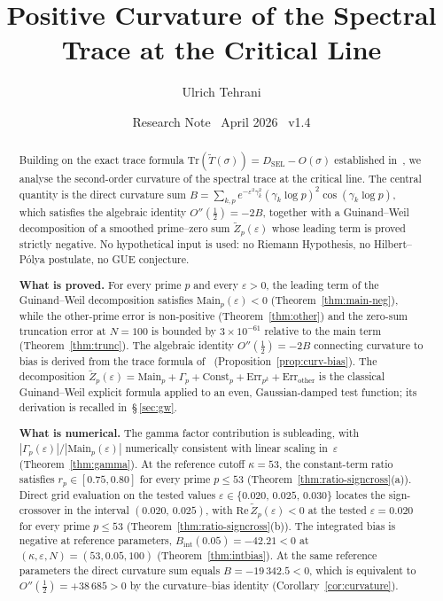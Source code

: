 \documentclass[11pt]{article}
\title{\vspace{-1.5em}\bfseries Positive Curvature of the Spectral Trace
at the Critical Line}
\author{Ulrich Tehrani}
\date{Research Note \textperiodcentered\ April 2026
      \textperiodcentered\ v1.4}
\newcommand{\Tt}{\widetilde{T}}
\newcommand{\Zt}{\widetilde{Z}}
\newcommand{\DSEL}{D_{\mathrm{SEL}}}
\begin{document}
\maketitle

\begin{abstract}
Building on the exact trace formula $\mathrm{Tr}(\Tt(\sigma))=\DSEL-O(\sigma)$
established in~\cite{Paper5}, we analyse the second-order curvature of the
spectral trace at the critical line.
The central quantity is the direct curvature sum
$B=\sum_{k,p} e^{-\varepsilon^2\gamma_k^2}(\gamma_k\log p)^2\cos(\gamma_k\log p)$,
which satisfies the algebraic identity $O''(\tfrac12)=-2B$, together with a
Guinand--Weil decomposition of a smoothed prime--zero sum $\Zt_p(\varepsilon)$
whose leading term is proved strictly negative.
No hypothetical input is used: no Riemann Hypothesis, no Hilbert--P\'olya
postulate, no GUE conjecture.

\textbf{What is proved.}
For every prime $p$ and every $\varepsilon>0$, the leading term of the
Guinand--Weil decomposition satisfies
$\mathrm{Main}_p(\varepsilon)<0$ (Theorem~\ref{thm:main-neg}), while the
other-prime error is non-positive
(Theorem~\ref{thm:other}) and the zero-sum truncation error at $N=100$
is bounded by $3\times 10^{-61}$ relative to the main term
(Theorem~\ref{thm:trunc}).
The algebraic identity $O''(\tfrac12)=-2B$ connecting curvature to bias
is derived from the trace formula of~\cite{Paper5}
(Proposition~\ref{prop:curv-bias}).
The decomposition
$\Zt_p(\varepsilon)=\mathrm{Main}_p+\Gamma_p+\mathrm{Const}_p
+\mathrm{Err}_{p^k}+\mathrm{Err}_{\mathrm{other}}$
is the classical Guinand--Weil explicit formula applied to an even,
Gaussian-damped test function; its derivation is recalled in~\S\,\ref{sec:gw}.

\textbf{What is numerical.}
The gamma factor contribution is subleading, with
$|\Gamma_p(\varepsilon)|/|\mathrm{Main}_p(\varepsilon)|$ numerically
consistent with linear scaling in~$\varepsilon$
(Theorem~\ref{thm:gamma}).
At the reference cutoff $\kappa=53$, the constant-term ratio satisfies
$r_p\in[0.75,0.80]$ for every prime $p\le 53$
(Theorem~\ref{thm:ratio-signcross}(a)).
Direct grid evaluation on the tested values
$\varepsilon\in\{0.020,\,0.025,\,0.030\}$ locates the sign-crossover
in the interval $(0.020,\,0.025)$, with
$\mathrm{Re}\,\Zt_p(\varepsilon)<0$ at the tested $\varepsilon=0.020$
for every prime $p\le 53$ (Theorem~\ref{thm:ratio-signcross}(b)).
The integrated bias is negative at reference parameters,
$B_{\mathrm{int}}(0.05)=-42.21<0$ at
$(\kappa,\varepsilon,N)=(53,0.05,100)$ (Theorem~\ref{thm:intbias}).
At the same reference parameters the direct curvature sum equals
$B=-19\,342.5<0$, which is equivalent to
$O''(\tfrac12)=+38\,685>0$ by the curvature--bias identity
(Corollary~\ref{cor:curvature}).


\end{abstract}
\end{document}
